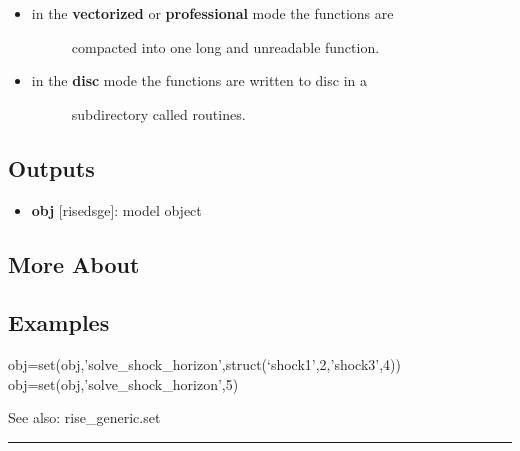\documentclass[letterpaper,10pt,english]{sphinxmanual}
\begin{document}
\begin{itemize}
\begin{itemize}
\begin{description}
\begin{itemize}
\begin{description}
\end{description}

\item {} \begin{description}
\item[{in the \textbf{vectorized} or \textbf{professional} mode the functions are}] \leavevmode
compacted into one long and unreadable function.

\end{description}

\item {} \begin{description}
\item[{in the \textbf{disc} mode the functions are written to disc in a}] \leavevmode
subdirectory called routines.

\end{description}

\end{itemize}

\end{description}

\end{itemize}

\end{itemize}


\subsection{Outputs}
\label{classes/models/@dsge/dsge:id161}\begin{itemize}
\item {} 
\textbf{obj} {[}rise\textbar{}dsge{]}: model object

\end{itemize}


\subsection{More About}
\label{classes/models/@dsge/dsge:id162}

\subsection{Examples}
\label{classes/models/@dsge/dsge:id163}
obj=set(obj,'solve\_shock\_horizon',struct(`shock1',2,'shock3',4))
obj=set(obj,'solve\_shock\_horizon',5)

See also: rise\_generic.set


\bigskip\hrule{}\bigskip
\end{document}
